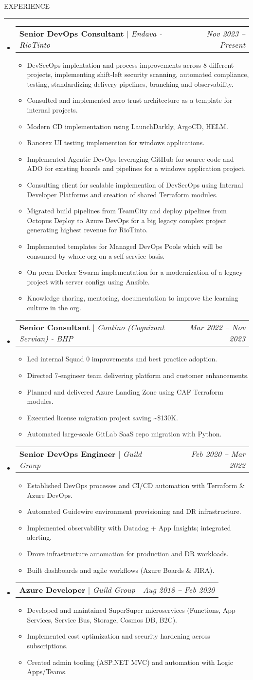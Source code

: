 \documentclass[letterpaper,10pt]{article}
\makeatletter
\newcommand{\expItem}[1]{\item{{#1 \vspace{-4pt}}}}
\newcommand{\expItemListStart}{\begin{itemize}}
\newcommand{\expItemListEnd}{\end{itemize}\vspace{-4pt}}
\newcommand{\expProjectHeading}[2]{\item\begin{tabular*}{0.97\textwidth}{l@{\extracolsep{\fill}}r}#1 & \textit{ #2} \\ \end{tabular*}\vspace{-6pt}}
\newcommand{\subheadingtitlevspace}{\vspace{-3pt}}
\newcommand{\titleItem}[1]{\textbf{#1}}
\newcommand{\resumeSubHeadingListStart}{\subheadingtitlevspace\begin{itemize}[leftmargin=0.15in, label={}]}
\newcommand{\resumeSubHeadingListEnd}{\end{itemize}}
\newcommand{\ResumeSection}[1]{\par{\fontsize{11pt}{13pt}\selectfont \MakeUppercase{#1}}\vspace{1pt}\hrule height 0.6pt}
\newcommand{\SectionContentGap}{}
\makeatother
\begin{document}
\ResumeSection{Experience}\vspace{-4pt}
\resumeSubHeadingListStart
\expProjectHeading{\titleItem{Senior DevOps Consultant} $|$ \emph{Endava - RioTinto}}{Nov 2023 -- Present}
\expItemListStart
\expItem{DevSecOps implentation and process improvements across 8 different projects, implementing shift-left security scanning, automated compliance, testing, standardizing delivery pipelines, branching and observability.}
\expItem{Consulted and implemented zero trust architecture as a template for internal projects.}
\expItem{Modern CD implementation using LaunchDarkly, ArgoCD, HELM.}
\expItem{Ranorex UI testing implemention for windows applications.}
\expItem{Implemented Agentic DevOps leveraging GitHub for source code and ADO for existing boards and pipelines for a windows application project.}
\expItem{Consulting client for scalable implemention of DevSecOps using Internal Developer Platforms and creation of shared Terraform modules.}
\expItem{Migrated build pipelines from TeamCity and deploy pipelines from Octopus Deploy to Azure DevOps for a big legacy complex project generating highest revenue for RioTinto.}
\expItem{Implemented templates for Managed DevOps Pools which will be consumed by whole org on a self service basis.}
\expItem{On prem Docker Swarm implementation for a modernization of a legacy project with server configs using Ansible.}
\expItem{Knowledge sharing, mentoring, documentation to improve the learning culture in the org.}
\expItemListEnd
\expProjectHeading{\titleItem{Senior Consultant} $|$ \emph{Contino (Cognizant Servian) - BHP}}{Mar 2022 -- Nov 2023}
\expItemListStart
\expItem{Led internal Squad 0 improvements and best practice adoption.}
\expItem{Directed 7-engineer team delivering platform and customer enhancements.}
\expItem{Planned and delivered Azure Landing Zone using CAF Terraform modules.}
\expItem{Executed license migration project saving \textasciitilde{}\$130K.}
\expItem{Automated large-scale GitLab SaaS repo migration with Python.}
\expItemListEnd
\expProjectHeading{\titleItem{Senior DevOps Engineer} $|$ \emph{Guild Group}}{Feb 2020 -- Mar 2022}
\expItemListStart
\expItem{Established DevOps processes and CI/CD automation with Terraform \& Azure DevOps.}
\expItem{Automated Guidewire environment provisioning and DR infrastructure.}
\expItem{Implemented observability with Datadog + App Insights; integrated alerting.}
\expItem{Drove infrastructure automation for production and DR workloads.}
\expItem{Built dashboards and agile workflows (Azure Boards \& JIRA).}
\expItemListEnd
\expProjectHeading{\titleItem{Azure Developer} $|$ \emph{Guild Group}}{Aug 2018 -- Feb 2020}
\expItemListStart
\expItem{Developed and maintained SuperSuper microservices (Functions, App Services, Service Bus, Storage, Cosmos DB, B2C).}
\expItem{Implemented cost optimization and security hardening across subscriptions.}
\expItem{Created admin tooling (ASP.NET MVC) and automation with Logic Apps/Teams.}
\expItemListEnd
\resumeSubHeadingListEnd
\SectionContentGap
\end{document}
